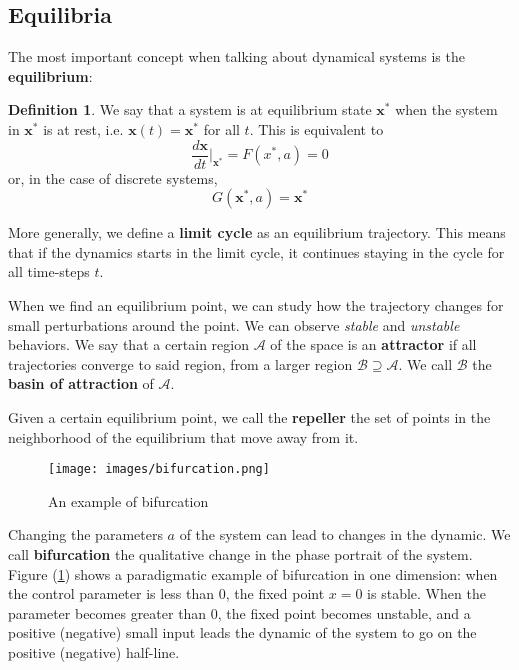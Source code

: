 \documentclass[oneside]{book}
\newcommand{\x}{\mathbf{x}}
\theoremstyle{definition}
\newtheorem{defn}{Definition}
\theoremstyle{plain}
\begin{document}
\subsection{Equilibria}

The most important concept when talking about dynamical systems is the \textbf{equilibrium}:
\begin{defn}
    We say that a system is at equilibrium state $\x^*$ when the system in $\x^*$ is at rest, i.e. $\x(t)=\x^*$ for all $t$. This is equivalent to
    \begin{equation}\label{eqn: equilibrium}
        \frac{d\x}{dt}{|_{\x^*}} =F({x{^*}}, a) =0
    \end{equation}
    or, in the case of discrete systems,
    \begin{equation}    \label{eqn: equilibrium_disc}
        G(\x^*, a) =\x^*
    \end{equation}
\end{defn}

More generally, we define a \textbf{limit cycle} as an equilibrium trajectory. This means that if the dynamics starts in the limit cycle, it continues staying in the cycle for all time-steps $t$.

When we find an equilibrium point, we can study how the trajectory changes for small perturbations around the point. We can observe \textit{stable} and \textit{unstable} behaviors. 
We say that a certain region $\mathcal{A}$ of the space is an \textbf{attractor} if all trajectories converge to said region, from a larger region $\mathcal{B}\supseteq \mathcal{A}$. We call $\mathcal{B}$ the \textbf{basin of attraction} of $\mathcal{A}$. 

Given a certain equilibrium point, we call the \textbf{repeller}  the set of points in the neighborhood of the  equilibrium that move away from it.

\begin{figure}
    \centering
    \texttt{[image: images/bifurcation.png]}
    \caption{An example of bifurcation}
    \label{fig:bifurcation}

\end{figure}
Changing the parameters $a$ of the system can lead to changes in the dynamic. We call \textbf{bifurcation} the qualitative change in the phase portrait of the system. Figure (\ref{fig:bifurcation}) shows a paradigmatic example of bifurcation in one dimension: when the control parameter is less than 0, the fixed point $x=0$ is stable. When the parameter becomes greater than 0, the fixed point becomes unstable, and a positive (negative) small input leads the dynamic of the system to go on the positive (negative) half-line.
\end{document}
